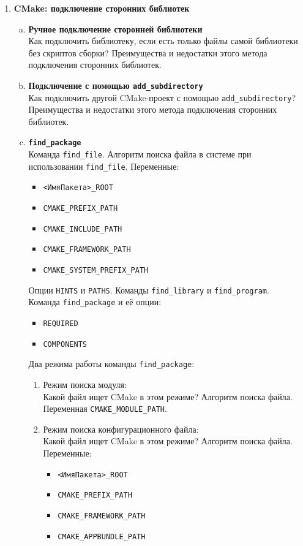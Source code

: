 \documentclass{article}
\begin{document}
\begin{enumerate}
\begin{enumerate}[a.]
\end{enumerate}





\newpage
\item \textbf{CMake: подключение сторонних библиотек}
\begin{enumerate}[a.]
\item \textbf{Ручное подключение сторонней библиотеки}\\
Как подключить библиотеку, если есть только файлы самой библиотеки без скриптов сборки?
Преимущества и недостатки этого метода подключения сторонних библиотек.

\item \textbf{Подключение с помощью \texttt{add\_subdirectory}}\\
Как подключить другой CMake-проект с помощью \texttt{add\_subdirectory}?
Преимущества и недостатки этого метода подключения сторонних библиотек.

\item \textbf{\texttt{find\_package}}\\
Команда \texttt{find\_file}. Алгоритм поиска файла в системе при использовании \texttt{find\_file}. Переменные:
\begin{itemize}
\item \texttt{<ИмяПакета>\_ROOT}
\item \texttt{CMAKE\_PREFIX\_PATH}
\item \texttt{CMAKE\_INCLUDE\_PATH}
\item \texttt{CMAKE\_FRAMEWORK\_PATH}
\item \texttt{CMAKE\_SYSTEM\_PREFIX\_PATH}
\end{itemize}
Опции \texttt{HINTS} и \texttt{PATHS}. Команды \texttt{find\_library} и \texttt{find\_program}.\\
Команда \texttt{find\_package} и её опции:
\begin{itemize}
\item \texttt{REQUIRED}
\item \texttt{COMPONENTS}
\end{itemize}
Два режима работы команды \texttt{find\_package}:
\begin{enumerate}
\item Режим поиска модуля:\\
Какой файл ищет CMake в этом режиме? Алгоритм поиска файла. Переменная \texttt{CMAKE\_MODULE\_PATH}.
\item Режим поиска конфигурационного файла:\\
Какой файл ищет CMake в этом режиме? Алгоритм поиска файла. Переменные:
\begin{itemize}
\item \texttt{<ИмяПакета>\_ROOT}
\item \texttt{CMAKE\_PREFIX\_PATH}
\item \texttt{CMAKE\_FRAMEWORK\_PATH}
\item \texttt{CMAKE\_APPBUNDLE\_PATH}
\end{itemize}
\end{enumerate}


\end{enumerate}
\end{enumerate}
\end{document}

